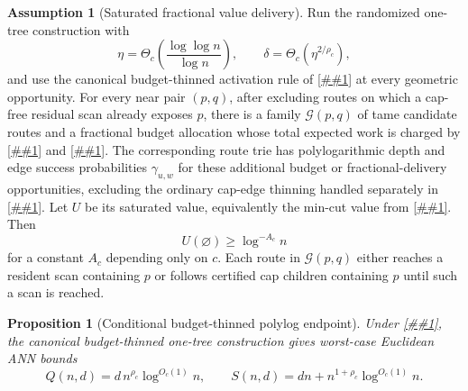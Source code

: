\documentclass[10pt]{article}
\newcommand{\cref}[1]{\ref{##1}}
\newtheorem{proposition}[theorem]{Proposition}
\theoremstyle{definition}
\newtheorem{assumption}[theorem]{Assumption}
\begin{document}
\begin{assumption}[Saturated fractional value delivery]\label{asm:aggregate-value-delivery}
   Run the randomized one-tree construction with
   \[
      \eta=\Theta_c\!\left(\frac{\log\log n}{\log n}\right),
      \qquad
      \delta=\Theta_c(\eta^{2/\rho_c}),
   \]
   and use the canonical budget-thinned activation rule of
   \cref{lem:budget-thinned-opportunities} at every geometric opportunity.
   For every near pair $(p,q)$, after excluding routes on which a cap-free
   residual scan already exposes $p$, there is a family
   $\mathcal G(p,q)$ of tame candidate routes and a fractional budget
   allocation whose total expected work is charged by
   \cref{lem:budget-thinned-opportunities} and
   \cref{lem:fractional-value-budget}. The corresponding route trie has
   polylogarithmic depth and edge success probabilities $\gamma_{u,w}$ for
   these additional budget or fractional-delivery opportunities, excluding the
   ordinary cap-edge thinning handled separately in
   \cref{lem:thin-lineage}. Let $U$ be its saturated value, equivalently the
   min-cut value from \cref{lem:saturated-value-mincut}. Then
   \[
      U(\varnothing)\ge \log^{-A_c}n
   \]
   for a constant $A_c$ depending only on $c$. Each route in
   $\mathcal G(p,q)$ either reaches a resident scan containing $p$ or follows
   certified cap children containing $p$ until such a scan is reached.
\end{assumption}

\begin{proposition}[Conditional budget-thinned polylog endpoint]\label{prop:budget-thinned-polylog}
   Under \cref{asm:aggregate-value-delivery}, the canonical budget-thinned
   one-tree construction gives worst-case Euclidean ANN bounds
   \[
      Q(n,d)=d\,n^{\rho_c}\log^{O_c(1)}n,
      \qquad
      S(n,d)=dn+n^{1+\rho_c}\log^{O_c(1)}n .
   \]
\end{proposition}
\end{document}
